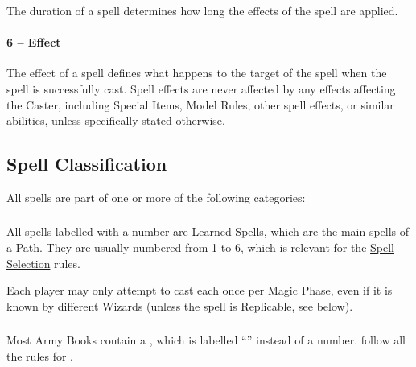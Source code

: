 The duration of a spell determines how long the effects of the spell are applied.

\paragraph{6 -- Effect}

The effect of a spell defines what happens to the target of the spell when the spell is successfully cast. Spell effects are never affected by any effects affecting the Caster, including Special Items, Model Rules, other spell effects, or similar abilities, unless specifically stated otherwise.

\columnbreak

\subsection{Spell Classification}
\label{spell_classification}

All spells are part of one or more of the following categories:

\subsubsection{\learnedspells}
\label{learned_spells}

All spells labelled with a number are Learned Spells, which are the main spells of a Path. They are usually numbered from 1 to 6, which is relevant for the \hyperref[spell_selection]{Spell Selection} rules.

Each player may only attempt to cast each \learnedspell{} once per Magic Phase, even if it is known by different Wizards (unless the spell is Replicable, see below).

\subsubsection{\hereditaryspells}
\idx[main=y]{\hereditaryspells}\label{hereditary_spells}

Most Army Books contain a \hereditaryspell{}, which is labelled \enquote{\textbf{\hereditaryspellnumber}} instead of a number. \hereditaryspells{} follow all the rules for \learnedspells{}.

\subsubsection{\attributespells}
\idx[main=y]{\attributespells}\label{attribute_spells}


